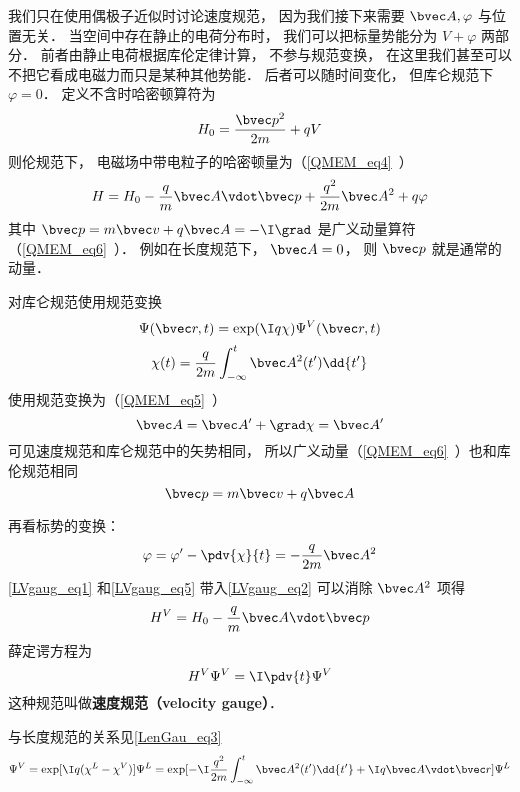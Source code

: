 

我们只在使用偶极子近似时讨论速度规范， 因为我们接下来需要 $\bvec A, \varphi$ 与位置无关． 当空间中存在静止的电荷分布时， 我们可以把标量势能分为 $V + \varphi$ 两部分． 前者由静止电荷根据库伦定律计算， 不参与规范变换， 在这里我们甚至可以不把它看成电磁力而只是某种其他势能． 后者可以随时间变化， 但库仑规范下 $\varphi = 0$． 定义不含时哈密顿算符为
\begin{equation}
H_0 = \frac{\bvec p^2}{2m} + qV
\end{equation}
则伦规范下， 电磁场中带电粒子的哈密顿量为（\autoref{QMEM_eq4}~）
\begin{equation}\label{LVgaug_eq2}
H = H_0 - \frac{q}{m} \bvec A \vdot \bvec p + \frac{q^2}{2m} \bvec A^2 + q\varphi
\end{equation}
其中 $\bvec p = m\bvec v + q\bvec A = -\I \grad$ 是广义动量算符（\autoref{QMEM_eq6}~）． 例如在长度规范下， $\bvec A = 0$， 则 $\bvec p$ 就是通常的动量．

对库仑规范使用规范变换
\begin{equation}\label{LVgaug_eq3}
\Psi(\bvec r, t) = \exp(\I q\chi)\Psi^V(\bvec r, t)
\end{equation}
\begin{equation}\label{LVgaug_eq4}
\chi(t) = \frac{q}{2m} \int_{-\infty}^t \bvec A^2(t') \dd{t'}
\end{equation}
使用规范变换为（\autoref{QMEM_eq5}~）
\begin{equation}\label{LVgaug_eq1}
\bvec A = \bvec A' + \grad \chi = \bvec A'
\end{equation}
可见速度规范和库仑规范中的矢势相同， 所以广义动量（\autoref{QMEM_eq6}~）也和库伦规范相同
\begin{equation}
\bvec p = m \bvec v + q\bvec A
\end{equation}

再看标势的变换：
\begin{equation}\label{LVgaug_eq5}
\varphi = \varphi' - \pdv{\chi}{t} = - \frac{q}{2m} \bvec A^2
\end{equation}
\autoref{LVgaug_eq1} 和\autoref{LVgaug_eq5} 带入\autoref{LVgaug_eq2} 可以消除 $\bvec A^2$ 项得
\begin{equation}
H^V = H_0 - \frac{q}{m} \bvec A \vdot \bvec p
\end{equation}
薛定谔方程为
\begin{equation}
H^V \Psi^V = \I \pdv{t} \Psi^V
\end{equation}
这种规范叫做\textbf{速度规范（velocity gauge）}．

与长度规范的关系见\autoref{LenGau_eq3}~
\begin{equation}
\Psi^V = \exp[\I q(\chi^L - \chi^V)]\Psi^L = \exp[-\I\frac{q^2}{2m}\int_{-\infty}^t \bvec A^2(t')\dd{t'} + \I q \bvec A\vdot \bvec r] \Psi^L
\end{equation}

